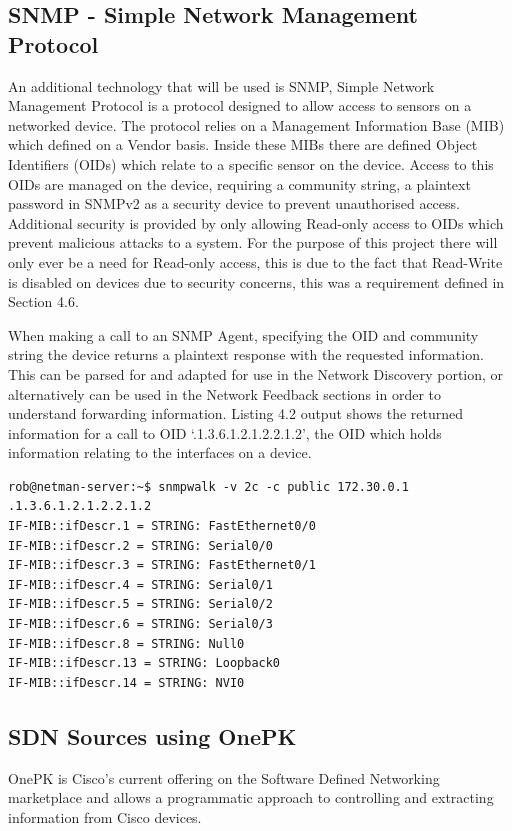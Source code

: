 \documentclass[11pt]{report}
\begin{document}
\subsection{SNMP - Simple Network Management Protocol}

An additional technology that will be used is SNMP, Simple Network Management Protocol \citep{case1989simple} is a protocol designed to allow access to sensors on a networked device. The protocol relies on a Management Information Base (MIB) which defined on a Vendor basis. Inside these MIBs there are defined Object Identifiers (OIDs) which relate to a specific sensor on the device. Access to this OIDs are managed on the device, requiring a community string, a plaintext password in SNMPv2 as a security device to prevent unauthorised access. Additional security is provided by only allowing Read-only access to OIDs which prevent malicious attacks to a system. For the purpose of this project there will only ever be a need for Read-only access, this is due to the fact that Read-Write is disabled on devices due to security concerns, this was a requirement defined in Section 4.6.

When making a call to an SNMP Agent, specifying the OID and community string the device returns a plaintext response with the requested information. This can be parsed for and adapted for use in the Network Discovery portion, or alternatively can be used in the Network Feedback sections in order to understand forwarding information. Listing 4.2 output shows the returned information for a call to OID `.1.3.6.1.2.1.2.2.1.2', the OID which holds information relating to the interfaces on a device.

\begin{lstlisting}[caption=Example of an SNMP Query]
rob@netman-server:~$ snmpwalk -v 2c -c public 172.30.0.1 .1.3.6.1.2.1.2.2.1.2
IF-MIB::ifDescr.1 = STRING: FastEthernet0/0
IF-MIB::ifDescr.2 = STRING: Serial0/0
IF-MIB::ifDescr.3 = STRING: FastEthernet0/1
IF-MIB::ifDescr.4 = STRING: Serial0/1
IF-MIB::ifDescr.5 = STRING: Serial0/2
IF-MIB::ifDescr.6 = STRING: Serial0/3
IF-MIB::ifDescr.8 = STRING: Null0
IF-MIB::ifDescr.13 = STRING: Loopback0
IF-MIB::ifDescr.14 = STRING: NVI0
\end{lstlisting}

\subsection{SDN Sources using OnePK}

OnePK is Cisco's current offering on the Software Defined Networking marketplace and allows a programmatic approach to controlling and extracting information from Cisco devices.
\end{document}
